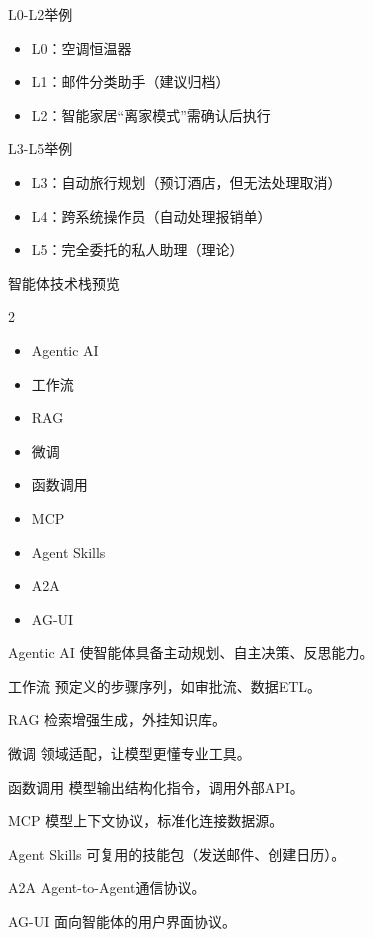 \begin{frame}{L0-L2举例}
\begin{itemize}
\item L0：空调恒温器
\item L1：邮件分类助手（建议归档）
\item L2：智能家居“离家模式”需确认后执行
\end{itemize}
\end{frame}
\begin{frame}{L3-L5举例}
\begin{itemize}
\item L3：自动旅行规划（预订酒店，但无法处理取消）
\item L4：跨系统操作员（自动处理报销单）
\item L5：完全委托的私人助理（理论）
\end{itemize}
\end{frame}

\begin{frame}{智能体技术栈预览}
\begin{multicols}{2}
\begin{itemize}
\item Agentic AI
\item 工作流
\item RAG
\item 微调
\item 函数调用
\item MCP
\item Agent Skills
\item A2A
\item AG-UI
\end{itemize}
\end{multicols}
\end{frame}

\begin{frame}{Agentic AI}
使智能体具备主动规划、自主决策、反思能力。
\end{frame}
\begin{frame}{工作流}
预定义的步骤序列，如审批流、数据ETL。
\end{frame}
\begin{frame}{RAG}
检索增强生成，外挂知识库。
\end{frame}
\begin{frame}{微调}
领域适配，让模型更懂专业工具。
\end{frame}
\begin{frame}{函数调用}
模型输出结构化指令，调用外部API。
\end{frame}
\begin{frame}{MCP}
模型上下文协议，标准化连接数据源。
\end{frame}
\begin{frame}{Agent Skills}
可复用的技能包（发送邮件、创建日历）。
\end{frame}
\begin{frame}{A2A}
Agent-to-Agent通信协议。
\end{frame}
\begin{frame}{AG-UI}
面向智能体的用户界面协议。
\end{frame}

